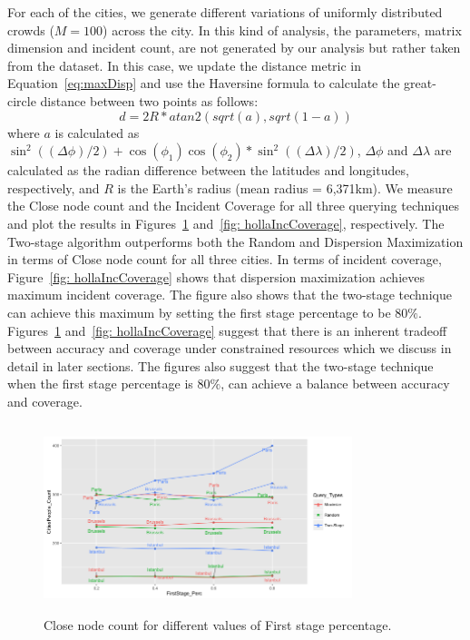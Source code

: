 \documentclass{acm_proc_article-sp}
\begin{document}
For each of the cities, we generate different variations of uniformly distributed crowds ($M = 100$) across the city. In this kind of analysis, the parameters, matrix dimension and incident count, are not generated by our analysis but rather taken from the dataset. In this case, we update the distance metric in Equation~\ref{eq:maxDisp} and use the Haversine formula to calculate the great-circle distance between two points as follows:
\begin{equation} \label{eq:maxDisp2}
d = 2R*atan2(sqrt(a), sqrt(1-a))
\end{equation}
where $a$ is calculated as $ \sin ^2((\Delta \phi)/2 ) + \cos(\phi_1)\cos(\phi_2) * \sin ^2((\Delta \lambda)/2 )$, $\Delta \phi$ and $\Delta \lambda$ are calculated as the radian difference between the latitudes and longitudes, respectively, and $R$ is the Earth's radius (mean radius = 6,371km). We measure the Close node count and the Incident Coverage for all three querying techniques and plot the results in Figures~\ref{fig: hollaCloseCount} and~\ref{fig: hollaIncCoverage}, respectively. The Two-stage algorithm outperforms both the Random and Dispersion Maximization in terms of Close node count for all three cities. In terms of incident coverage, Figure~\ref{fig: hollaIncCoverage} shows that dispersion maximization achieves maximum incident coverage. The figure also shows that the two-stage technique can achieve this maximum by setting the first stage percentage to be $80\%$. Figures~\ref{fig: hollaCloseCount} and~\ref{fig: hollaIncCoverage} suggest that there is an inherent tradeoff between accuracy and coverage under constrained resources which we discuss in detail in later sections. The figures also suggest that the two-stage technique when the first stage percentage is $80\%$, can achieve a balance between accuracy and coverage.\par
\begin{figure}[!h]
\centering
\includegraphics[width=9cm ,height=5.5cm]{figuresPng/hollaCloseCnt.png}
\caption{Close node count for different values of First stage percentage. }
\label{fig: hollaCloseCount}
\end{figure}
\end{document}
